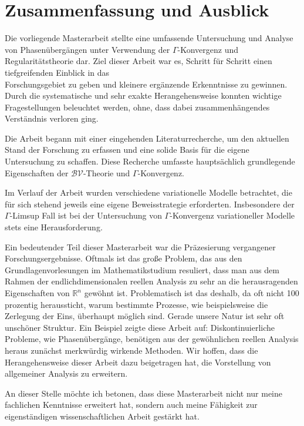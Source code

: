 \chapter{Zusammenfassung und Ausblick}{\label{ch:final}}
Die vorliegende Masterarbeit stellte eine umfassende Untersuchung und Analyse von Phasenübergängen unter Verwendung der \(\Gamma\)-Konvergenz und Regularitätstheorie dar. Ziel dieser Arbeit war es, Schritt für Schritt einen tiefgreifenden Einblick in das \\Forschungsgebiet zu geben und kleinere ergänzende Erkenntnisse zu gewinnen. Durch die systematische und sehr exakte Herangehensweise konnten wichtige Fragestellungen beleuchtet werden, ohne, dass dabei zusammenhängendes Verständnis verloren ging.

Die Arbeit begann mit einer eingehenden Literaturrecherche, um den aktuellen Stand der Forschung zu erfassen und eine solide Basis für die eigene Untersuchung zu schaffen. Diese Recherche umfasste hauptsächlich grundlegende Eigenschaften der \(\mathcal{BV}\)-Theorie und \(\Gamma\)-Konvergenz.

Im Verlauf der Arbeit wurden verschiedene variationelle Modelle betrachtet, die für sich stehend jeweils eine eigene Beweisstrategie erforderten. Insbesondere der \(\Gamma\)-Limsup Fall ist bei der Untersuchung von \(\Gamma\)-Konvergenz variationeller Modelle stets eine Herausforderung.

Ein bedeutender Teil dieser Masterarbeit war die Präzesierung vergangener \\Forschungsergebnisse. Oftmals ist das große Problem, das aus den Grundlagenvorlesungen im Mathematikstudium resuliert, dass man aus dem Rahmen der endlichdimensionalen reellen Analysis zu sehr an die herausragenden Eigenschaften von \(\mathbb{R}^n\) gewöhnt ist. Problematisch ist das deshalb, da oft nicht 100 prozentig heraussticht, warum bestimmte Prozesse, wie beispielsweise die Zerlegung der Eins, überhaupt möglich sind. Gerade unsere Natur ist sehr oft unschöner Struktur. Ein Beispiel zeigte diese Arbeit auf: Diskontinuierliche Probleme, wie Phasenübergänge, benötigen aus der gewöhnlichen reellen Analysis heraus zunächst merkwürdig wirkende Methoden. Wir hoffen, dass die Herangehensweise dieser Arbeit dazu beigetragen hat, die Vorstellung von allgemeiner Analysis zu erweitern.

An dieser Stelle möchte ich betonen, dass diese Masterarbeit nicht nur meine fachlichen Kenntnisse erweitert hat, sondern auch meine Fähigkeit zur eigenständigen wissenschaftlichen Arbeit gestärkt hat.

